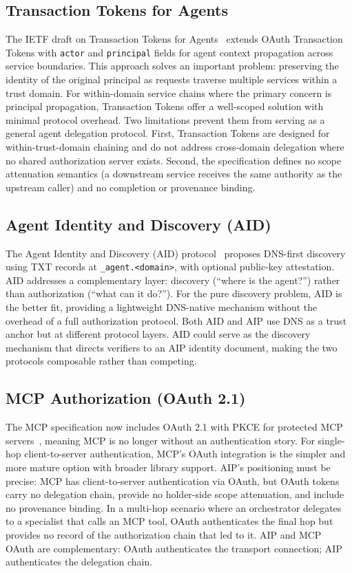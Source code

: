 \documentclass[11pt,a4paper]{article}
\newcommand{\aip}{\textsc{AIP}}
\begin{document}
\subsection{Transaction Tokens for Agents}
\label{sec:txntokens}

The IETF draft on Transaction Tokens for Agents~\citep{ietf2026txntokens} extends OAuth Transaction Tokens with \texttt{actor} and \texttt{principal} fields for agent context propagation across service boundaries. This approach solves an important problem: preserving the identity of the original principal as requests traverse multiple services within a trust domain. For within-domain service chains where the primary concern is principal propagation, Transaction Tokens offer a well-scoped solution with minimal protocol overhead. Two limitations prevent them from serving as a general agent delegation protocol. First, Transaction Tokens are designed for within-trust-domain chaining and do not address cross-domain delegation where no shared authorization server exists. Second, the specification defines no scope attenuation semantics (a downstream service receives the same authority as the upstream caller) and no completion or provenance binding.

\subsection{Agent Identity and Discovery (AID)}
\label{sec:aid}

The Agent Identity and Discovery (AID) protocol~\citep{ietf2026aid} proposes DNS-first discovery using TXT records at \texttt{\_agent.<domain>}, with optional public-key attestation. AID addresses a complementary layer: discovery (``where is the agent?'') rather than authorization (``what can it do?''). For the pure discovery problem, AID is the better fit, providing a lightweight DNS-native mechanism without the overhead of a full authorization protocol. Both AID and AIP use DNS as a trust anchor but at different protocol layers. AID could serve as the discovery mechanism that directs verifiers to an AIP identity document, making the two protocols composable rather than competing.

\subsection{MCP Authorization (OAuth 2.1)}
\label{sec:mcp-auth}

The MCP specification now includes OAuth 2.1 with PKCE for protected MCP servers~\citep{anthropic2024mcp}, meaning MCP is no longer without an authentication story. For single-hop client-to-server authentication, MCP's OAuth integration is the simpler and more mature option with broader library support. \aip{}'s positioning must be precise: MCP has client-to-server authentication via OAuth, but OAuth tokens carry no delegation chain, provide no holder-side scope attenuation, and include no provenance binding. In a multi-hop scenario where an orchestrator delegates to a specialist that calls an MCP tool, OAuth authenticates the final hop but provides no record of the authorization chain that led to it. AIP and MCP OAuth are complementary: OAuth authenticates the transport connection; AIP authenticates the delegation chain.
\end{document}
